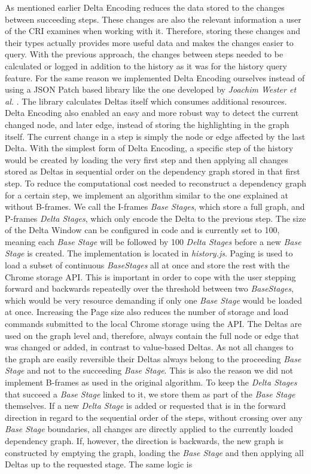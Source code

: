 As mentioned earlier Delta Encoding reduces the data stored to the changes between succeeding steps. These changes are also the relevant information a user of the CRI examines when working with it. Therefore, storing these changes and their types actually provides more useful data and makes the changes easier to query. With the previous approach, the changes between steps needed to be calculated or logged in addition to the history as it was for the history query feature. For the same reason we implemented Delta Encoding ourselves instead of using a JSON Patch \cite{JSONPatch} based library like the one developed by \emph{Joachim Wester et al.} \cite{JSONPatchImplementation}. The library calculates Deltas itself which consumes additional resources. Delta Encoding also enabled an easy and more robust way to detect the current changed node, and later edge, instead of storing the highlighting in the graph itself. The current change in a step is simply the node or edge affected by the last Delta. With the simplest form of Delta Encoding, a specific step of the history would be created by loading the very first step and then applying all changes stored as Deltas in sequential order on the dependency graph stored in that first step. To reduce the computational cost needed to reconstruct a dependency graph for a certain step, we implement an algorithm similar to the one explained at \cite{VideoEncoding} without B-frames. We call the I-frames \emph{Base Stages}, which store a full graph, and P-frames \emph{Delta Stages}, which only encode the Delta to the previous step. The size of the Delta Window can be configured in code and is currently set to 100, meaning each \emph{Base Stage} will be followed by 100 \emph{Delta Stages} before a new \emph{Base Stage} is created. The implementation is located in \emph{history.js}. Paging is used to load a subset of continuous \emph{BaseStages} all at once and store the rest with the Chrome storage API. This is important in order to cope with the user stepping forward and backwards repeatedly over the threshold between two \emph{BaseStages}, which would be very resource demanding if only one \emph{Base Stage} would be loaded at once. Increasing the Page size also reduces the number of storage and load commands submitted to the local Chrome storage using the API. The Deltas are used on the graph level and, therefore, always contain the full node or edge that was changed or added, in contrast to value-based Deltas. As not all changes to the graph are easily reversible their Deltas always belong to the proceeding \emph{Base Stage} and not to the succeeding \emph{Base Stage}. This is also the reason we did not implement B-frames as used in the original algorithm. To keep the \emph{Delta Stages} that succeed a \emph{Base Stage} linked to it, we store them as part of the \emph{Base Stage} themselves. If a new \emph{Delta Stage} is added or requested that is in the forward direction in regard to the sequential order of the steps, without crossing over any \emph{Base Stage} boundaries, all changes are directly applied to the currently loaded dependency graph. If, however, the direction is backwards, the new graph is constructed by emptying the graph, loading the \emph{Base Stage} and then applying all Deltas up to the requested stage. The same logic is 